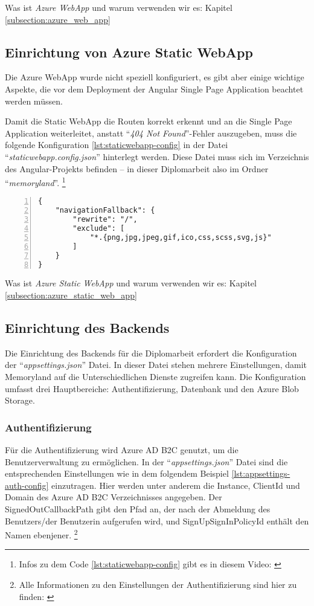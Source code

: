 Was ist \emph{Azure WebApp} und warum verwenden wir es: Kapitel \ref{subsection:azure_web_app}


\subsection{Einrichtung von Azure Static WebApp}

Die Azure WebApp wurde nicht speziell konfiguriert, es gibt aber einige wichtige Aspekte, 
die vor dem Deployment der Angular Single Page Application beachtet werden müssen.  

Damit die Static WebApp die Routen korrekt erkennt und an die Single Page Application 
weiterleitet, anstatt ``\emph{404 Not Found}''-Fehler auszugeben, muss die folgende 
Konfiguration \ref{lst:staticwebapp-config} in der Datei ``\emph{staticwebapp.config.json}'' hinterlegt werden. 
Diese Datei muss sich im Verzeichnis des Angular-Projekts befinden -- in dieser Diplomarbeit
also im Ordner ``\emph{memoryland}''. \footnote{Infos zu dem Code \ref{lst:staticwebapp-config} gibt es in diesem Video: \cite{MicrosoftCorporationj}}

\begin{lstlisting}[numbers=left,caption={staticwebapp.config.json},label={lst:staticwebapp-config}]
{
    "navigationFallback": {
        "rewrite": "/",
        "exclude": [
            "*.{png,jpg,jpeg,gif,ico,css,scss,svg,js}"
        ]
    }
}
\end{lstlisting}

Was ist \emph{Azure Static WebApp} und warum verwenden wir es: Kapitel \ref{subsection:azure_static_web_app}


\subsection{Einrichtung des Backends}

Die Einrichtung des Backends für die Diplomarbeit erfordert die Konfiguration 
der ``\emph{appsettings.json}'' Datei. In dieser Datei stehen mehrere Einstellungen,
damit Memoryland auf die Unterschiedlichen Dienste zugreifen kann. Die Konfiguration 
umfasst drei Hauptbereiche: Authentifizierung, Datenbank und den Azure Blob Storage.

\subsubsection{Authentifizierung}

Für die Authentifizierung wird Azure AD B2C genutzt, um die Benutzerverwaltung zu ermöglichen. 
In der ``\emph{appsettings.json}'' Datei sind die entsprechenden Einstellungen wie in dem folgendem
Beispiel \ref{lst:appsettings-auth-config} einzutragen. Hier werden unter anderem die Instance, ClientId und Domain des 
Azure AD B2C Verzeichnisses angegeben. Der SignedOutCallbackPath gibt den Pfad an, der nach 
der Abmeldung des Benutzers/der Benutzerin aufgerufen wird, und SignUpSignInPolicyId enthält 
den Namen ebenjener. \footnote{Alle Informationen zu den Einstellungen der Authentifizierung sind hier zu finden: \cite{MicrosoftCorporationk}}

